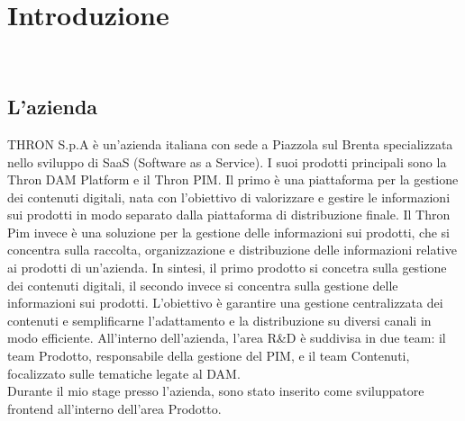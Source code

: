 \chapter{Introduzione}
\label{cap:introduzione}




\\


\section{L'azienda}

THRON S.p.A è un'azienda italiana con sede a Piazzola sul Brenta specializzata nello sviluppo di SaaS (Software as a Service).
I suoi prodotti principali sono la Thron DAM Platform e il Thron PIM. 
Il primo è una piattaforma per la gestione dei contenuti digitali, nata con l'obiettivo di valorizzare e gestire le informazioni 
sui prodotti in modo separato dalla piattaforma di distribuzione finale.
Il Thron Pim invece è una soluzione per la gestione delle informazioni sui prodotti, che si concentra
sulla raccolta, organizzazione e distribuzione delle informazioni relative ai prodotti di un'azienda.
In sintesi, il primo prodotto si concetra sulla gestione dei contenuti digitali, il secondo invece
si concentra sulla gestione delle informazioni sui prodotti.
L'obiettivo è garantire una gestione centralizzata dei contenuti e semplificarne l'adattamento e la distribuzione su diversi
canali in modo efficiente.
All'interno dell'azienda, l'area R\&D è suddivisa in due team: il team Prodotto, responsabile della gestione
del PIM, e il team Contenuti, focalizzato sulle tematiche legate al DAM.\\
Durante il mio stage presso l'azienda, sono stato inserito come sviluppatore frontend all'interno dell'area Prodotto.

